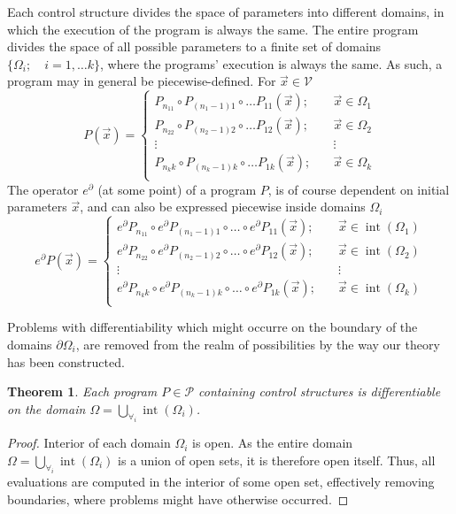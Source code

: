 \documentclass[preprint,12pt]{elsarticle}
\newcommand{\VV}{\mathcal{V}}
\newcommand{\dP}{\mathcal{P}}
\newcommand{\D}{\partial}
\DeclareMathOperator{\interior}{int}
\newtheorem{izrek}{Theorem}[section]
\begin{document}
 Each control structure divides the space of parameters into different domains, in which the execution of the program is always the same. The entire program divides the space of all possible parameters to a finite set of domains $\{\Omega_i;\quad i=1,\ldots
  k\}$, where the programs' execution is always the same. As such, a program may in general be piecewise-defined. For $\vec{x}\in\VV$
 \begin{equation}
   \label{eq:zlrprk_splosno}
   P(\vec{x}) =
   \begin{cases}
     P_{n_11}\circ P_{(n_1-1)1}\circ\ldots P_{11}(\vec{x});&\quad \vec{x}\in\Omega_1\\
     P_{n_22}\circ P_{(n_2-1)2}\circ\ldots P_{12}(\vec{x});&\quad \vec{x}\in\Omega_2\\
     \vdots&\quad\vdots\\
     P_{n_kk}\circ P_{(n_k-1)k}\circ\ldots P_{1k}(\vec{x});&\quad \vec{x}\in\Omega_k\\
   \end{cases}
 \end{equation}
 The operator $e^\D$ (at some point) of a program $P$, is of course dependent on initial parameters $\vec{x}$, and can also be expressed piecewise inside domains $\Omega_i$
 \begin{equation}
   \label{eq:Dzlrprk_splosno}
   e^\D P({\vec{x}}) =
   \begin{cases}
     e^\D P_{n_11}\circ e^\D P_{(n_1-1)1}\circ\ldots\circ e^\D P_{11}(\vec{x});&\quad \vec{x}\in\interior(\Omega_1)\\
     e^\D P_{n_22}\circ e^\D P_{(n_2-1)2}\circ\ldots\circ e^\D P_{12}(\vec{x});&\quad \vec{x}\in\interior(\Omega_2)\\
     \vdots&\quad\vdots\\
     e^\D P_{n_kk}\circ e^\D P_{(n_k-1)k}\circ\ldots\circ e^\D P_{1k}(\vec{x});&\quad \vec{x}\in\interior(\Omega_k)\\
   \end{cases}
 \end{equation}

 Problems with differentiability which might  occurre on the boundary of the domains $\partial\Omega_i$, are removed from the realm of possibilities by the way our theory has been constructed.


 \begin{izrek}\label{izr:diferentiableOnDomain}
 Each program $P\in\dP$ containing control structures is differentiable on the domain $\Omega=\bigcup\limits_{\forall_i}\interior(\Omega_i)$.
 \end{izrek}
 \begin{proof}
  Interior of each domain $\Omega_i$ is open. As the entire domain $\Omega=\bigcup\limits_{\forall_i}\interior(\Omega_i)$ is a union of open sets, it is therefore open itself. Thus, all evaluations are computed in the interior of some open set, effectively removing boundaries, where problems might have otherwise occurred.
 \end{proof}
 
\end{document}
